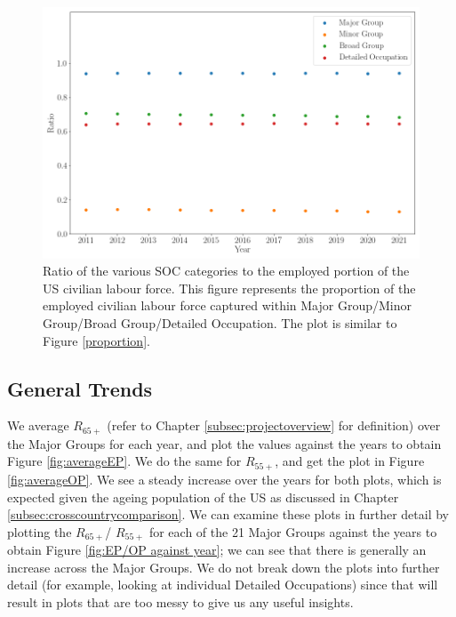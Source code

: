\documentclass[11pt]{article}
\begin{document}
\begin{figure}[!htb]
	\centering
	\includegraphics[width=15cm]{Figures/Proportion (employed) for all.png}
	\caption{Ratio of the various SOC categories to the employed portion of the US civilian labour force. This figure represents the proportion of the employed civilian labour force captured within Major Group/Minor Group/Broad Group/Detailed Occupation. The plot is similar to Figure \ref{proportion}.}
	\label{proportionemp}
\end{figure}
    
\subsection{General Trends}
\label{subsec:generaltrends}
We average $R_{65+}$ (refer to Chapter \ref{subsec:projectoverview} for definition) over the Major Groups for each year, and plot the values against the years to obtain Figure \ref{fig:averageEP}. We do the same for  $R_{55+}$, and get the plot in Figure \ref{fig:averageOP}. We see a steady increase over the years for both plots, which is expected given the ageing population of the US as discussed in Chapter \ref{subsec:crosscountrycomparison}. We can examine these plots in further detail by plotting the $R_{65+}$/ $R_{55+}$ for each of the 21 Major Groups against the years to obtain Figure \ref{fig:EP/OP against year}; we can see that there is generally an increase across the Major Groups. We do not break down the plots into further detail (for example, looking at individual Detailed Occupations) since that will result in plots that are too messy to give us any useful insights.
\end{document}
